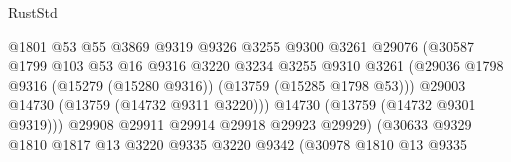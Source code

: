 \begin{lexlean}{RustStd}
\begin{coremodule}
                                            @1801
                                            @53
                                            @55
                                            @3869
                                            @9319
                                            @9326
                                            @3255
                                            @9300
                                            @3261
                                            @29076
                                            (@30587
                                              @1799
                                              @103
                                              @53
                                              @16
                                              @9316
                                              @3220
                                              @3234
                                              @3255
                                              @9310
                                              @3261
                                              (@29036
                                                @1798
                                                @9316
                                                (@15279 (@15280 @9316))
                                                (@13759 (@15285 @1798 @53)))
                                              @29003
                                              @14730
                                              (@13759 (@14732 @9311 @3220)))
                                            @14730
                                            (@13759 (@14732 @9301 @9319)))
                                          @29908
                                          @29911
                                          @29914
                                          @29918
                                          @29923
                                          @29929)
                                        (@30633
                                          @9329
                                          @1810
                                          @1817
                                          @13
                                          @3220
                                          @9335
                                          @3220
                                          @9342
                                          (@30978
                                            @1810
                                            @13
                                            @9335

\end{coremodule}
\end{lexlean}
